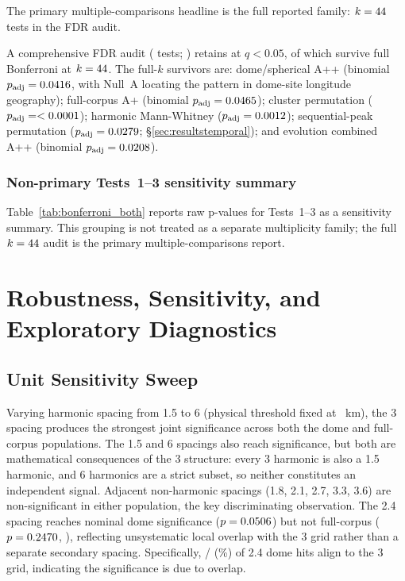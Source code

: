 The primary multiple-comparisons headline is the full reported family:
$k = 44{}$ tests in the FDR audit.

A comprehensive FDR audit (\NtotalTests{} tests;
\citealt{benjamini1995controlling}) retains \NsurviveFDR{} at $q < 0.05$,
of which \NsurviveBonfAll{} survive full Bonferroni at $k = 44$.
The \NsurviveBonfAll{} full-$k$ survivors are:
dome/spherical A++ (binomial $p_\mathrm{adj} =
0.0416$, with Null~A locating the pattern in
dome-site longitude geography);
full-corpus A+ (binomial $p_\mathrm{adj} = 0.0465$);
cluster permutation ($p_\mathrm{adj} = < 0.0001$);
harmonic Mann-Whitney ($p_\mathrm{adj} = 0.0012$);
sequential-peak permutation ($p_\mathrm{adj} = 0.0279$; \S\ref{sec:resultstemporal});
and evolution combined A++ (binomial $p_\mathrm{adj} = 0.0208$).

\subsubsection*{Non-primary Tests~1--3 sensitivity summary}
Table~\ref{tab:bonferroni_both} reports raw p-values for Tests~1--3 as
a sensitivity summary. This grouping is not treated as a separate
multiplicity family; the full $k = 44$ audit is the primary
multiple-comparisons report.

\section{Robustness, Sensitivity, and Exploratory Diagnostics}
\label{sec:robustness}

\subsection{Unit Sensitivity Sweep}
\label{sec:metrology}

Varying harmonic spacing from 1.5\textdegree{} to 6\textdegree{} (physical threshold
fixed at \ApThreshKm{}~km), the 3\textdegree{} spacing produces the strongest joint
significance across both the dome and full-corpus populations.
The 1.5\textdegree{} and 6\textdegree{} spacings also reach significance, but both are
mathematical consequences of the 3\textdegree{} structure: every 3\textdegree{}
harmonic is also a 1.5\textdegree{} harmonic, and 6\textdegree{} harmonics are a strict
subset, so neither constitutes an independent signal.
Adjacent non-harmonic spacings (1.8\textdegree{}, 2.1\textdegree{}, 2.7\textdegree{}, 3.3\textdegree{}, 3.6\textdegree{}) are
non-significant in either population, the key discriminating observation.
The 2.4\textdegree{} spacing reaches nominal dome significance
($p = 0.0506$) but not full-corpus ($p = 0.2470$, \sweepEightFullPSig{}),
reflecting unsystematic local overlap with the 3\textdegree{} grid rather than
a separate secondary spacing.
Specifically, \sweepEightTenDomeBoth{}/\sweepZeroEightDomeHits{} 
(\sweepEightTenDomePctOfEight\%) of 2.4\textdegree{} dome hits align 
to the 3\textdegree{} grid, indicating the significance is due to overlap.

